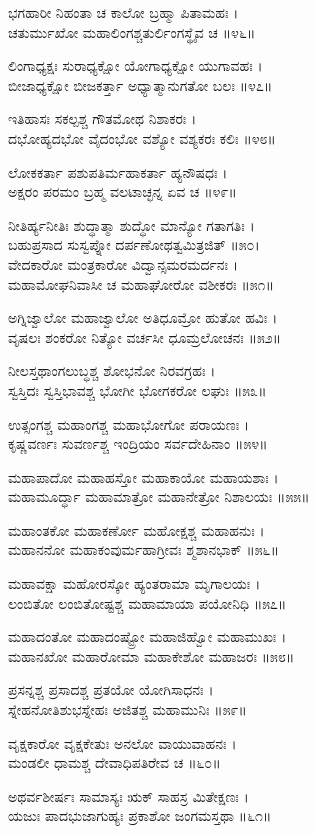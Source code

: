 ಭಗಹಾರೀ ನಿಹಂತಾ ಚ ಕಾಲೋ ಬ್ರಹ್ಮಾ ಪಿತಾಮಹಃ ।\\
ಚತುರ್ಮುಖೋ ಮಹಾಲಿಂಗಶ್ಚತುರ್ಲಿಂಗಸ್ಥೈವ ಚ ॥೪೬॥

ಲಿಂಗಾಧ್ಯಕ್ಷಃ ಸುರಾಧ್ಯಕ್ಷೋ ಯೋಗಾಧ್ಯಕ್ಷೋ ಯುಗಾವಹಃ ।\\
ಬೀಜಾಧ್ಯಕ್ಷೋ ಬೀಜಕರ್ತ್ತಾ ಅಧ್ಯಾತ್ಮಾನುಗತೋ ಬಲಃ ॥೪೭॥

ಇತಿಹಾಸಃ ಸಕಲ್ಪಶ್ಚ ಗೌತಮೋಥ ನಿಶಾಕರಃ ।\\
ದಭೋಹ್ಯದಭೋ ವೈದಂಭೋ ವಶ್ಯೋ ವಶ್ಯಕರಃ ಕಲಿಃ ॥೪೮॥

ಲೋಕಕರ್ತಾ ಪಶುಪತಿರ್ಮಹಾಕರ್ತಾ ಹ್ಯನೌಷಧಃ ।\\
ಅಕ್ಷರಂ ಪರಮಂ ಬ್ರಹ್ಮ ವಲಟಾಚ್ಛನ್ನ ಏವ ಚ ॥೪೯॥

ನೀತಿರ್ಹ್ಯನೀತಿಃ ಶುದ್ಧಾತ್ಮಾ ಶುದ್ಧೋ ಮಾನ್ಯೋ ಗತಾಗತಿಃ ।\\
ಬಹುಪ್ರಸಾದ ಸುಸ್ವಪ್ನೋ ದರ್ಪಣೋಥತ್ವಮಿತ್ರಜಿತ್ ॥೫೦।\\
ವೇದಕಾರೋ ಮಂತ್ರಕಾರೋ ವಿದ್ವಾನ್ಸಮರಮರ್ದನಃ ।\\
ಮಹಾಮೋಘನಿವಾಸೀ ಚ ಮಹಾಘೋರೋ ವಶೀಕರಃ ॥೫೧॥

ಅಗ್ನಿಜ್ವಾಲೋ ಮಹಾಜ್ವಾಲೋ ಅತಿಧೂಮ್ರೋ ಹುತೋ ಹವಿಃ ।\\
ವೃಷಲಃ ಶಂಕರೋ ನಿತ್ಯೋ ವರ್ಚಸೀ ಧೂಮ್ರಲೋಚನಃ ॥೫೨॥

ನೀಲಸ್ತಥಾಂಗಲುಬ್ಧಶ್ಚ ಶೋಭನೋ ನಿರವಗ್ರಹಃ ।\\
ಸ್ವಸ್ತಿದಃ ಸ್ವಸ್ತಿಭಾವಶ್ಚ ಭೋಗೀ ಭೋಗಕರೋ ಲಘುಃ ॥೫೩॥

ಉತ್ಸಂಗಶ್ಚ ಮಹಾಂಗಶ್ಚ ಮಹಾಭೋಗೋ ಪರಾಯಣಃ ।\\
ಕೃಷ್ಣವರ್ಣಃ ಸುವರ್ಣಶ್ಚ ಇಂದ್ರಿಯಂ ಸರ್ವದೇಹಿನಾಂ ॥೫೪॥

ಮಹಾಪಾದೋ ಮಹಾಹಸ್ತೋ ಮಹಾಕಾಯೋ ಮಹಾಯಶಾಃ ।\\
ಮಹಾಮೂರ್ದ್ಧಾ ಮಹಾಮಾತ್ರೋ ಮಹಾನೇತ್ರೋ ನಿಶಾಲಯಃ ॥೫೫॥

ಮಹಾಂತಕೋ ಮಹಾಕರ್ಣೋ ಮಹೋಕ್ಷಶ್ಚ ಮಹಾಹನುಃ ।\\
ಮಹಾನನೋ ಮಹಾಕಂವುರ್ಮಹಾಗ್ರೀವಃ ಶ್ಮಶಾನಭಾಕ್ ॥೫೬॥

ಮಹಾವಕ್ಷಾ ಮಹೋರಸ್ಕೋ ಹ್ಯಂತರಾಮಾ ಮೃಗಾಲಯಃ ।\\
ಲಂಬಿತೋ ಲಂಬಿತೋಷ್ಟಶ್ಚ ಮಹಾಮಾಯಾ ಪಯೋನಿಧಿ ॥೫೭॥

ಮಹಾದಂತೋ ಮಹಾದಂಷ್ಟ್ರೋ ಮಹಾಜಿಹ್ವೋ ಮಹಾಮುಖಃ ।\\
ಮಹಾನಖೋ ಮಹಾರೋಮಾ ಮಹಾಕೇಶೋ ಮಹಾಜರಃ ॥೫೮॥

ಪ್ರಸನ್ನಶ್ಚ ಪ್ರಸಾದಶ್ಚ ಪ್ರತಯೋ ಯೋಗಿಸಾಧನಃ ।\\
ಸ್ನೇಹನೋತಿಶುಭಸ್ನೇಹಃ ಅಜಿತಶ್ಚ ಮಹಾಮುನಿಃ ॥೫೯॥

ವೃಕ್ಷಕಾರೋ ವೃಕ್ಷಕೇತುಃ ಅನಲೋ ವಾಯುವಾಹನಃ ।\\
ಮಂಡಲೀ ಧಾಮಶ್ಚ ದೇವಾಧಿಪತಿರೇವ ಚ ॥೬೦॥

ಅಥರ್ವಶೀರ್ಷಃ ಸಾಮಾಸ್ಯಃ ಋಕ್ ಸಾಹಸ್ರ ಮಿತೇಕ್ಷಣಃ ।\\
ಯಜುಃ ಪಾದಭುಜಾಗುಹ್ಯಃ ಪ್ರಕಾಶೋ ಜಂಗಮಸ್ತಥಾ ॥೬೧॥

